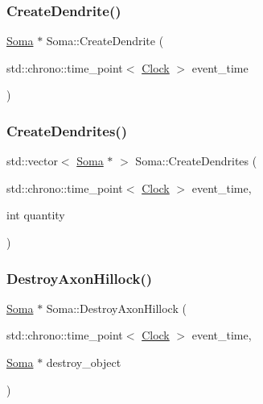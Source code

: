 \mbox{\label{classSoma_a0fab0c7cf54c2b7d36e90edcd3e21a16}} 
\subsubsection{\texorpdfstring{Create\+Dendrite()}{CreateDendrite()}}
{\footnotesize\ttfamily \mbox{\hyperlink{classSoma}{Soma}} $\ast$ Soma\+::\+Create\+Dendrite (\begin{DoxyParamCaption}\item[{std\+::chrono\+::time\+\_\+point$<$ \mbox{\hyperlink{universe_8h_a0ef8d951d1ca5ab3cfaf7ab4c7a6fd80}{Clock}} $>$}]{event\+\_\+time }\end{DoxyParamCaption})}

\mbox{\label{classSoma_a68dc02eff2912ad045900ab1879f020e}} 
\subsubsection{\texorpdfstring{Create\+Dendrites()}{CreateDendrites()}}
{\footnotesize\ttfamily std\+::vector$<$ \mbox{\hyperlink{classSoma}{Soma}} $\ast$ $>$ Soma\+::\+Create\+Dendrites (\begin{DoxyParamCaption}\item[{std\+::chrono\+::time\+\_\+point$<$ \mbox{\hyperlink{universe_8h_a0ef8d951d1ca5ab3cfaf7ab4c7a6fd80}{Clock}} $>$}]{event\+\_\+time,  }\item[{int}]{quantity }\end{DoxyParamCaption})}

\mbox{\label{classSoma_af6d6d3e3c94f06682cf05a7a72032a46}} 
\subsubsection{\texorpdfstring{Destroy\+Axon\+Hillock()}{DestroyAxonHillock()}}
{\footnotesize\ttfamily \mbox{\hyperlink{classSoma}{Soma}} $\ast$ Soma\+::\+Destroy\+Axon\+Hillock (\begin{DoxyParamCaption}\item[{std\+::chrono\+::time\+\_\+point$<$ \mbox{\hyperlink{universe_8h_a0ef8d951d1ca5ab3cfaf7ab4c7a6fd80}{Clock}} $>$}]{event\+\_\+time,  }\item[{\mbox{\hyperlink{classSoma}{Soma}} $\ast$}]{destroy\+\_\+object }\end{DoxyParamCaption})}

